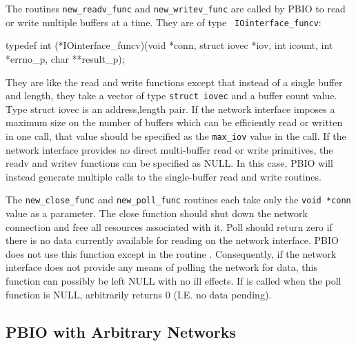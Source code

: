 The routines {\tt new\_readv\_func} and {\tt new\_writev\_func} are called by
PBIO to read or write multiple buffers at a time.  They are of type {\tt
IOinterface\_funcv}:
\begin{Code}
typedef int (*IOinterface_funcv)(void *conn, struct iovec *iov, int icount,
                                 int *errno_p, char **result_p);
\end{Code}
They are like the read and write functions except that instead of a single
buffer and length, they take a vector of type {\tt struct iovec} and a buffer
count value. Type {struct iovec} is an address,length pair.  If the network
interface imposes a maximum size on the number of buffers which can be
efficiently read or written in one call, that value should be specified as the
{\tt max\_iov} value in the  call.  If the
network interface provides no direct multi-buffer read or write primitives,
the readv and writev functions can be specified as NULL.  In this case, PBIO
will instead generate multiple calls to the single-buffer read and write
routines. 

The {\tt new\_close\_func} and {\tt new\_poll\_func} routines each take only
the {\tt void *conn} value as a parameter.  The close function should shut
down the network connection and free all resources associated with it.  Poll
should return zero if there is no data currently available for reading on the
network interface.  PBIO does not use this function except in the routine
.  Consequently, if the network interface does not
provide any 
means of polling the network for data, this function can possibly be left NULL
with no ill effects.  If  is called when the poll function
is NULL,  arbitrarily returns 0 (I.E. no data pending).

\subsection{PBIO with Arbitrary Networks\label{iocontext}}

